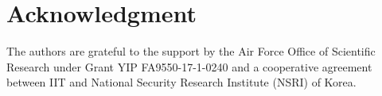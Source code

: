 \section*{Acknowledgment}
The authors are grateful to the support by the Air Force Office of Scientific Research under Grant YIP FA9550-17-1-0240 and a cooperative agreement between IIT and National Security Research Institute (NSRI) of Korea.